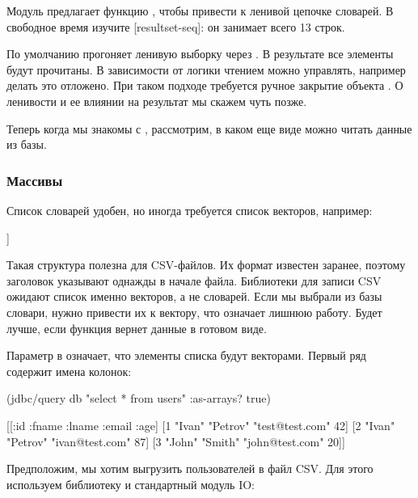 Модуль  предлагает функцию , чтобы привести  к ленивой цепочке словарей. В свободное время изучите [result\-set-\-seq]: он занимает всего 13 строк.

По умолчанию  прогоняет ленивую выборку через . В результате все элементы  будут прочитаны. В зависимости от логики чтением можно управлять, например делать это отложено. При таком подходе требуется ручное закрытие объекта . О ленивости и ее влиянии на результат мы скажем чуть позже.

Теперь когда мы знакомы с , рассмотрим, в каком еще виде можно читать данные из базы.

\subsubsection{Массивы}

Список словарей удобен, но иногда требуется список векторов, например:

\begin{english}
  \begin{clojure}
[[1 "Ivan" "Petrov" "test@test.com"]
 [2 "Ivan" "Petrov" "ivan@test.com"]
 [3 "John" "Smith" "john@test.com"]]
  \end{clojure}
\end{english}

Такая структура полезна для CSV-файлов. Их формат известен заранее, поэтому заголовок указывают однажды в начале файла. Библиотеки для записи CSV ожидают список именно векторов, а не словарей. Если мы выбрали из базы словари, нужно привести их к вектору, что означает лишнюю работу. Будет лучше, если функция  вернет данные в готовом виде.

Параметр  в  означает, что элементы списка будут векторами. Первый ряд содержит имена колонок:

\begin{english}
  \begin{clojure}
(jdbc/query db "select * from users" {:as-arrays? true})

[[:id :fname :lname :email :age]
 [1 "Ivan" "Petrov" "test@test.com" 42]
 [2 "Ivan" "Petrov" "ivan@test.com" 87]
 [3 "John" "Smith" "john@test.com" 20]]
  \end{clojure}
\end{english}

Предположим, мы хотим выгрузить пользователей в файл CSV. Для этого используем библиотеку  и стандартный модуль IO:

